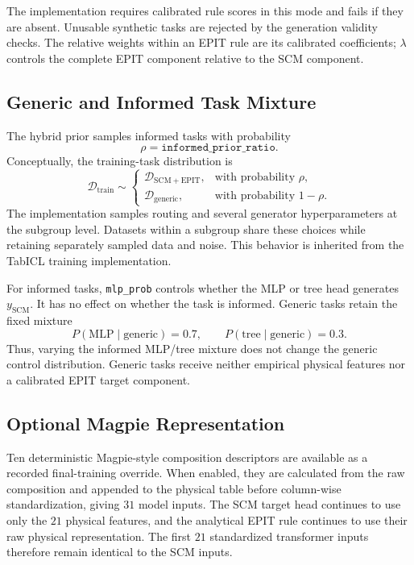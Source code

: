 \documentclass{article}
\begin{document}
The implementation requires calibrated rule scores in this mode and fails if
they are absent. Unusable synthetic tasks are rejected by the generation
validity checks. The relative weights within an EPIT rule are its calibrated
coefficients; \(\lambda\) controls the complete EPIT component relative to the
SCM component.

\subsection{Generic and Informed Task Mixture}

The hybrid prior samples informed tasks with probability
\[
\rho=\texttt{informed\_prior\_ratio}.
\]
Conceptually, the training-task distribution is
\begin{equation}
\mathcal{D}_{\mathrm{train}}\sim
\begin{cases}
\mathcal{D}_{\mathrm{SCM+EPIT}},&\text{with probability }\rho,\\
\mathcal{D}_{\mathrm{generic}},&\text{with probability }1-\rho.
\end{cases}
\label{eq:hybrid-routing}
\end{equation}
The implementation samples routing and several generator hyperparameters at
the subgroup level. Datasets within a subgroup share these choices while
retaining separately sampled data and noise. This behavior is inherited from
the TabICL training implementation.

For informed tasks, \texttt{mlp\_prob} controls whether the MLP or tree head
generates \(y_{\mathrm{SCM}}\). It has no effect on whether the task is
informed. Generic tasks retain the fixed mixture
\[
P(\mathrm{MLP}\mid\mathrm{generic})=0.7,
\qquad P(\mathrm{tree}\mid\mathrm{generic})=0.3.
\]
Thus, varying the informed MLP/tree mixture does not change the generic
control distribution. Generic tasks receive neither empirical physical
features nor a calibrated EPIT target component.

\subsection{Optional Magpie Representation}

Ten deterministic Magpie-style composition descriptors are available as a
recorded final-training override. When enabled, they are calculated from the
raw composition and appended to the physical table before column-wise
standardization, giving \(31\) model inputs. The SCM target head continues to
use only the \(21\) physical features, and the analytical EPIT rule continues
to use their raw physical representation. The first \(21\) standardized
transformer inputs therefore remain identical to the SCM inputs.
\end{document}
